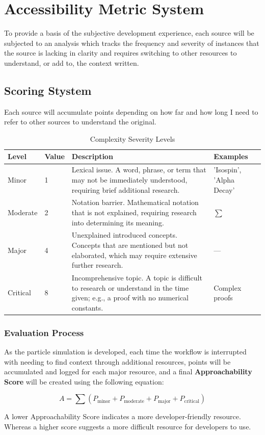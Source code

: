 \chapter{Accessibility Metric System}

To provide a basis of the subjective development experience, each source will be subjected to an analysis which tracks the frequency
and severity of instances that the source is lacking in clarity and requires switching to other resources to understand, or add to,
the context written.

\section{Scoring Stystem}

Each source will accumulate points depending on how far and how long I need to refer to other sources to understand the original.

\begin{table}[h]
\centering
\caption{Complexity Severity Levels}
\label{tab:severity}
\begin{tabularx}{\textwidth}{@{} ll X l @{}}
\toprule
\textbf{Level} & \textbf{Value} & \textbf{Description} & \textbf{Examples} \\ \midrule
Minor    & 1 & Lexical issue. A word, phrase, or term that may not be immediately understood, requiring brief additional research. & 'Isospin', 'Alpha Decay' \\ \addlinespace
Moderate & 2 & Notation barrier. Mathematical notation that is not explained, requiring research into determining its meaning. & $\sum$ \\ \addlinespace
Major    & 4 & Unexplained introduced concepts. Concepts that are mentioned but not elaborated, which may require extensive further research. & --- \\ \addlinespace
Critical & 8 & Incomprehensive topic. A topic is difficult to research or understand in the time given; e.g., a proof with no numerical constants. & Complex proofs \\ \bottomrule
\end{tabularx}
\end{table}

\subsection{Evaluation Process}

As the particle simulation is developed, each time the workflow is interrupted with needing to find context through
additional resources, points will be accumulated and logged for each major resource, and a final 
\textbf{Approachability Score} will be created using the following equation:

\begin{equation}
    A = \sum (P_{\text{minor}} + P_{\text{moderate}} + P_{\text{major}} + P_{\text{critical}})
\end{equation}

A lower Approachability Score indicates a more developer-friendly resource. Whereas a higher score suggests a more difficult resource
for developers to use.